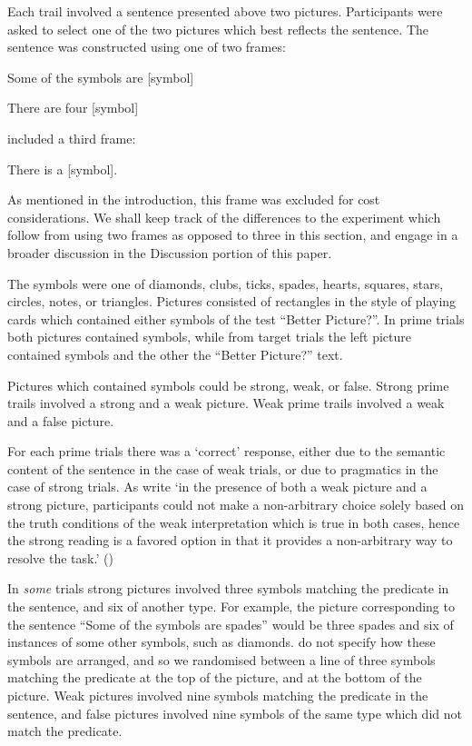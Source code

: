 \documentclass[10pt]{article}
\begin{document}
\begin{multicols}{2}
Each trail involved a sentence presented above two pictures.
Participants were asked to select one of the two pictures which best reflects the sentence.
The sentence was constructed using one of two frames:
\begin{enumerate*}[label=(\roman*)]
\item Some of the symbols are [symbol]
\item There are four [symbol]
\end{enumerate*}
\citeauthor{Bott:2016aa} included a third frame:
\begin{enumerate*}[label=(\roman*), resume]
\item There is a [symbol].
\end{enumerate*}
As mentioned in the introduction, this frame was excluded for cost considerations.
We shall keep track of the differences to the experiment which follow from using two frames as opposed to three in this section, and engage in a broader discussion in the Discussion portion of this paper.

The symbols were one of diamonds, clubs, ticks, spades, hearts, squares, stars, circles, notes, or triangles.
Pictures consisted of rectangles in the style of playing cards which contained either symbols of the test ``Better Picture?''.
In prime trials both pictures contained symbols, while from target trials the left picture contained symbols and the other the ``Better Picture?'' text.

Pictures which contained symbols could be strong, weak, or false.
Strong prime trails involved a strong and a weak picture.
Weak prime trails involved a weak and a false picture.

For each prime trials there was a `correct' response, either due to the semantic content of the sentence in the case of weak trials, or due to pragmatics in the case of strong trials.
As \citeauthor{Bott:2016aa} write `in the presence of both a weak picture and a strong picture, participants could not make a non-arbitrary choice solely based on the truth conditions of the weak interpretation which is true in both cases, hence the strong reading is a favored option in that it provides a non-arbitrary way to resolve the task.' (\citeyear[124]{Bott:2016aa})

In \emph{some} trials strong pictures involved three symbols matching the predicate in the sentence, and six of another type.
For example, the picture corresponding to the sentence ``Some of the symbols are spades'' would be three spades and six of instances of some other symbols, such as diamonds.
\citeauthor{Bott:2016aa} do not specify how these symbols are arranged, and so we randomised between a line of three symbols matching the predicate at the top of the picture, and at the bottom of the picture.
Weak pictures involved nine symbols matching the predicate in the sentence, and false pictures involved nine symbols of the same type which did not match the predicate.


\end{multicols}
\end{document}
